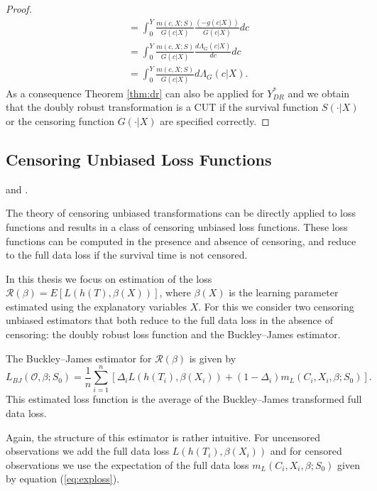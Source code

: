 \documentclass[12pt, a4paper]{scrartcl}
\theoremstyle{definition}
\theoremstyle{plain}
\numberwithin{equation}{section}
\numberwithin{figure}{section}
\numberwithin{table}{section}
\begin{document}
\begin{proof}
\begin{equation*}
\begin{split}
		& = \int_{0}^{Y}\frac{m(c,X;S)}{G(c\vert X)}\frac{(-g(c\vert X))}{G(c\vert X)}dc\\
		&= \int_{0}^{Y}\frac{m(c,X;S)}{G(c\vert X)}\frac{d\Lambda_G(c \vert X)}{dc}dc\\
		&= \int_{0}^{Y}\frac{m(c,X;S)}{G(c\vert X)}d\Lambda_G(c \vert X).
		\end{split}
		\end{equation*}
		As a consequence Theorem \ref{thm:dr} can also be applied for $Y_{DR}^*$ and we obtain that the doubly robust transformation is a CUT if the survival function $S(\cdot\vert X)$ or the censoring function $G(\cdot\vert X)$ are specified correctly.
	\end{proof}

	\subsection{Censoring Unbiased Loss Functions}\label{sec:cudls}
	\citet*{culs} and \citet*{basearticle}.
	
	The theory of censoring unbiased transformations can be directly applied to loss functions and results in a class of censoring unbiased loss functions. 
	These loss functions can be computed in the presence and absence of censoring, and reduce to the full data loss if the survival time is not censored.
	
	In this thesis we focus on estimation of the loss $\mathcal{R} (\beta) = E[L(h(T),\beta(X))]$, where $\beta(X)$ is the learning parameter estimated using the explanatory variables $X$.
	For this we consider two censoring unbiased estimators that both reduce to the full data loss in the absence of censoring: the doubly robust loss function and the Buckley--James estimator.
	
	
	The Buckley--James estimator for $\mathcal{R}(\beta)$ is given by
	\begin{equation}\label{eq:bj}
	L_{BJ}(\mathcal{O}, \beta; S_0) = \frac{1}{n} \sum_{i=1}^n \left[ \Delta_i L(h(T_i), \beta(X_i))+(1-\Delta_i)m_L(C_i, X_i, \beta; S_0)\right].
	\end{equation}
	This estimated loss function is the average of the Buckley--James transformed full data loss.
	
	Again, the structure of this estimator is rather intuitive.
	For uncensored observations we add the full data loss $L(h(T_i), \beta(X_i))$ and for censored observations we use the expectation of the full data loss $m_L(C_i, X_i, \beta; S_0)$ given by equation (\ref{eq:exploss}).
	
\end{document}
